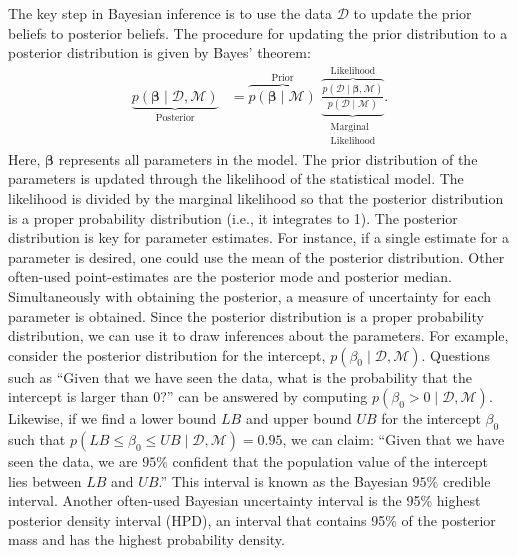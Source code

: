 \documentclass[man, floatsintext]{apa7}
\newcommand{\prob}[1]{p\left(#1\right)}
\newcommand{\lik}[1]{p\left(#1\right)}
\newcommand{\data}{\mathcal{D}}
\newcommand{\model}{\mathcal{M}}
\begin{document}
The key step in Bayesian inference is to use the data $\data$ to update the prior beliefs to posterior beliefs.
The procedure for updating the prior distribution to a posterior distribution is given by Bayes' theorem:
\begin{align*}\label{eq:BayesTheorem}
\underbrace{\prob{\bm{\beta} \mid \data , \model}}_{\text{Posterior}}
&=
\overbrace{\prob{\bm{\beta}\mid \model}}^{\text{Prior}}
\,\,
\underbrace{\overbrace{
		\frac{\lik{\data \mid \bm{\beta}, \model}}{\prob{\data \mid \model}}
	}^{\text{Likelihood}}}_{\substack{\text{Marginal}\\ \text{Likelihood}}}.
\end{align*}
Here, $\bm{\beta}$ represents all parameters in the model. The prior distribution of the parameters is updated through the likelihood of the statistical model. The likelihood is divided by the marginal likelihood so that the posterior distribution is a proper probability distribution (i.e., it integrates to 1). The posterior distribution is key for parameter estimates. For instance, if a single estimate for a parameter is desired, one could use the mean of the posterior distribution. Other often-used point-estimates are the posterior mode and posterior median. Simultaneously with obtaining the posterior, a measure of uncertainty for each parameter is obtained. Since the posterior distribution is a proper probability distribution, we can use it to draw inferences about the parameters. For example, consider the posterior distribution for the intercept, $\prob{\beta_0 \mid \data , \model}$. Questions such as ``Given that we have seen the data, what is the probability that the intercept is larger than 0?'' can be answered by computing $\prob{\beta_0 > 0 \mid \data , \model}$. Likewise, if we find a lower bound $LB$ and upper bound $UB$ for the intercept $\beta_0$ such that $\prob{ LB \leq \beta_0 \leq UB \mid \data , \model} = 0.95$, we can claim: ``Given that we have seen the data, we are $95\%$ confident that the population value of the intercept lies between $LB$ and $UB$.'' This interval is known as the Bayesian $95\%$ credible interval. Another often-used Bayesian uncertainty interval is the 95\% highest posterior density interval (HPD), an interval that contains 95\% of the posterior mass and has the highest probability density.
\end{document}
